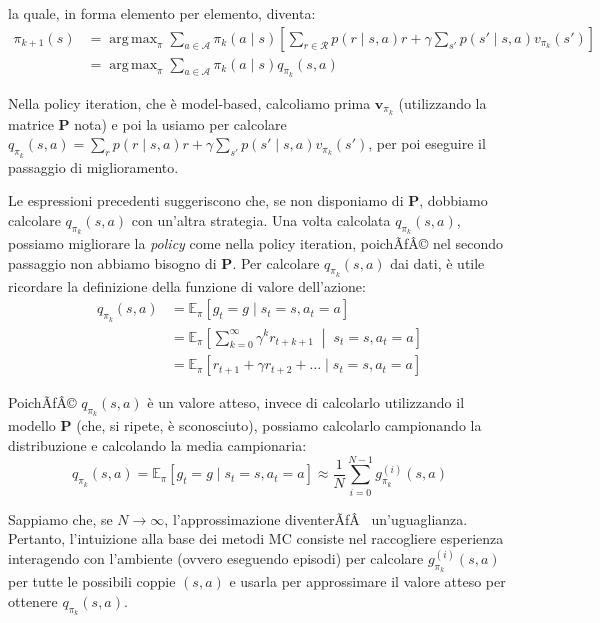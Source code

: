 ﻿\documentclass[11pt, a4paper]{report}
\DeclareMathOperator*{\argmax}{arg\,max}
\begin{document}
\newpage

la quale, in forma elemento per elemento, diventa:
\begin{align}
\pi_{k+1}(s) &= \argmax_{\pi} \sum_{a \in \mathcal{A}} \pi_k(a \mid s) \left[ \sum_{r \in \mathcal{R}} p(r \mid s, a)r + \gamma \sum_{s'} p(s' \mid s, a)v_{\pi_k}(s') \right] \nonumber \\
&= \argmax_{\pi} \sum_{a \in \mathcal{A}} \pi_k(a \mid s) q_{\pi_k}(s, a)
\end{align}

Nella policy iteration, che è model-based, calcoliamo prima $\bm{v}_{\pi_k}$ (utilizzando la matrice $\bm{P}$ nota) e poi la usiamo per calcolare $q_{\pi_k}(s, a) = \sum_r p(r \mid s, a)r + \gamma \sum_{s'} p(s' \mid s, a)v_{\pi_k}(s')$, per poi eseguire il passaggio di miglioramento.

Le espressioni precedenti suggeriscono che, se non disponiamo di $\bm{P}$, dobbiamo calcolare $q_{\pi_k}(s, a)$ con un'altra strategia. Una volta calcolata $q_{\pi_k}(s, a)$, possiamo migliorare la \emph{policy} come nella policy iteration, poichÃƒÂ© nel secondo passaggio non abbiamo bisogno di $\bm{P}$. Per calcolare $q_{\pi_k}(s, a)$ dai dati, è utile ricordare la definizione della funzione di valore dell'azione:
\begin{align}
q_{\pi_k}(s, a) &= \mathbb{E}_\pi [g_t = g \mid s_t = s, a_t = a] \nonumber \\
&= \mathbb{E}_\pi \left[ \sum_{k=0}^{\infty} \gamma^k r_{t+k+1} \;\middle|\; s_t = s, a_t = a \right] \nonumber \\
&= \mathbb{E}_\pi [ r_{t+1} + \gamma r_{t+2} + \dots \mid s_t = s, a_t = a ]
\end{align}

PoichÃƒÂ© $q_{\pi_k}(s, a)$ è un valore atteso, invece di calcolarlo utilizzando il modello $\bm{P}$ (che, si ripete, è sconosciuto), possiamo calcolarlo campionando la distribuzione e calcolando la media campionaria:
\begin{equation}
q_{\pi_k}(s, a) = \mathbb{E}_\pi [g_t = g \mid s_t = s, a_t = a] \approx \frac{1}{N} \sum_{i=0}^{N-1} g_{\pi_k}^{(i)}(s, a)
\end{equation}

Sappiamo che, se $N \to \infty$, l'approssimazione diventerÃƒÂ  un'uguaglianza. Pertanto, l'intuizione alla base dei metodi MC consiste nel raccogliere esperienza interagendo con l'ambiente (ovvero eseguendo episodi) per calcolare $g_{\pi_k}^{(i)}(s, a)$ per tutte le possibili coppie $(s, a)$ e usarla per approssimare il valore atteso per ottenere $q_{\pi_k}(s, a)$.
\end{document}
